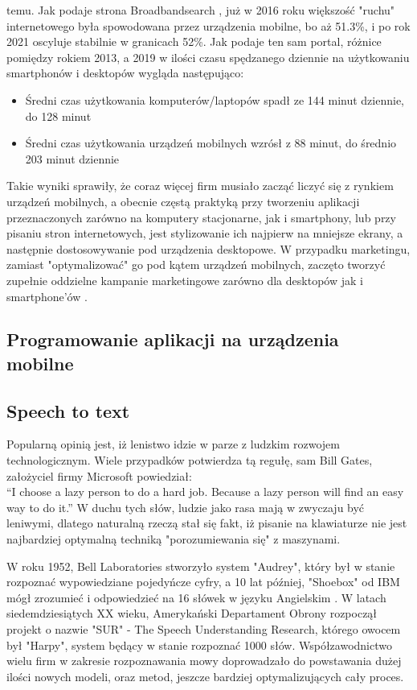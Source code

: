 \documentclass[12pt, a4paper]{article}
\begin{document}
\begin{sloppypar}
{{    temu. Jak podaje strona Broadbandsearch \cite{dvm}, już w 2016 roku większość "ruchu"
    internetowego była spowodowana przez urządzenia mobilne, bo aż 51.3\%, i po 
    rok 2021 oscyluje stabilnie w granicach 52\%. Jak podaje ten sam portal,
    różnice pomiędzy rokiem 2013, a 2019 w ilości czasu spędzanego dziennie na 
    użytkowaniu smartphonów i desktopów wygląda następująco:
    \begin{itemize}
      \item Średni czas użytkowania komputerów/laptopów spadł ze 144 minut dziennie, do 128 minut
      \item Średni czas użytkowania urządzeń mobilnych wzrósł z 88 minut, do średnio 203 minut dziennie 
    \end{itemize} 
    Takie wyniki sprawiły, że coraz więcej firm musiało zacząć liczyć się z 
    rynkiem urządzeń mobilnych, a obecnie częstą praktyką przy tworzeniu aplikacji 
    przeznaczonych zarówno na komputery stacjonarne, jak i smartphony, lub przy 
    pisaniu stron internetowych, jest stylizowanie ich najpierw na mniejsze ekrany,
    a następnie dostosowywanie pod urządzenia desktopowe. W przypadku marketingu, 
    zamiast "optymalizować" go pod kątem urządzeń mobilnych, zaczęto tworzyć zupełnie
    oddzielne kampanie marketingowe zarówno dla desktopów jak i smartphone'ów
    \cite{mobile_strategy}.
  }
  \subsection{Programowanie aplikacji na urządzenia mobilne}
  {
    
  }
  \subsection{Speech to text}
  {
    Popularną opinią jest, iż lenistwo idzie w parze z ludzkim rozwojem 
    technologicznym. Wiele przypadków potwierdza tą regułę, sam Bill Gates, założyciel
    firmy Microsoft powiedział:\\ 
    “I choose a lazy person to do a hard job. 
    Because a lazy person will find an easy way to do it.”
    W duchu tych słów, ludzie jako rasa mają w zwyczaju być leniwymi, dlatego
    naturalną rzeczą stał się fakt, iż pisanie na klawiaturze nie jest najbardziej 
    optymalną techniką "porozumiewania się" z maszynami.
    
    W roku 1952, Bell Laboratories stworzyło system "Audrey", który był w stanie 
    rozpoznać wypowiedziane pojedyńcze cyfry, a 10 lat później, "Shoebox" od IBM
    mógł zrozumieć i odpowiedzieć na 16 słówek w języku Angielskim \cite{speech_history}.
    W latach siedemdziesiątych XX wieku, Amerykański Departament Obrony rozpoczął
    projekt o nazwie "SUR" - The Speech Understanding Research, którego owocem
    był "Harpy", system będący w stanie rozpoznać 1000 słów. Współzawodnictwo wielu
    firm w zakresie rozpoznawania mowy doprowadzało do powstawania dużej ilości nowych
    modeli, oraz metod, jeszcze bardziej optymalizujących cały proces.

}}
\end{sloppypar}
\end{document}
